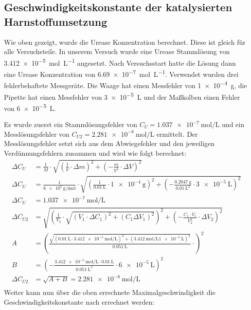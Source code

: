 \subsection{Geschwindigkeitskonstante der katalysierten Harnstoffumsetzung}
Wie oben gezeigt, wurde die Urease Konzentration berechnet. 
Diese ist gleich für alle Versuchsteile.
In unserem Versuch wurde eine Urease Stammlösung von \qty{3,412e-5}{\mole\per\liter} angesetzt.
Nach Versuchsstart hatte die Lösung dann eine Urease Konzentration von \qty{6,69e-7}{\mole\per\liter}.
Verwendet wurden drei fehlerbehaftete Messgeräte. Die Waage hat einen Messfehler von \qty{1e-4}{\gram}, die Pipette hat einen Messfehler von \qty{3e-5}{\liter} und der Maßkolben einen Fehler von \qty{6e-5}{\liter}.

Es wurde zuerst ein Stammlösungsfehler von $C_U = \qty{1,037e-7}{\mole\per\liter}$ und ein Messlösungsfehler von $C_{U2} = \qty{2,281e-8}{\mole\per\liter}$ ermittelt.
Der Messlösungsfehler setzt sich aus dem Abwiegefehler und den jeweiligen Verdünnungsfehlern zusammen und wird wie folgt berechnet:
\begin{align*}
\Delta C_U &= \frac{1}{M} \cdot \sqrt{\left(\frac{1}{V}\cdot \Delta m \right)^2 + \left( - \frac{m}{V^2} \cdot \Delta V \right)^2}\\
\Delta C_U &= \frac{1}{\qty{6e5}{\gram \per \mole}} \cdot   \sqrt{
    \left(
        \frac{1}{\qty{0.01}{\liter}}\cdot \qty{1e-4}{\gram}
    \right)^2 +
   \left(
        -\frac{\qty{0.2047}{\gram}}{\qty{0.01}{\liter}^2} \cdot \qty{3e-5}{\liter}
    \right)^2
    }\\
\Delta C_U &= \qty{1,037e-7}{\mole\per\liter}\\
\Delta C_{U2} &= \sqrt{\left(\frac{1}{V_2}\cdot \sqrt{\left( V_1 \cdot \Delta C_1 \right)^2 + \left( C_1 \Delta V_1 \right)^2}\right)^2 +\left( - \frac{C_1 \cdot V_1}{V_2^2}\cdot \Delta V_2 \right)^2}\\
A&=\left(\frac{\sqrt{( \qty{0,01}{\liter} \cdot \qty{3,412e-5}{\mole\per\liter} )^2 + \left( \qty{3,412}{\mole\per\liter} \qty{1e-5}{\liter} \right)^2}}{\qty{0,051}{\liter}}\cdot \right)^2 \\
    B&=\left( - \frac{\qty{3,412e-5}{\mole\per\liter} \cdot\qty{0,01}{\liter}}{\qty{0,051}{\liter}^2}\cdot \qty{6e-5}{\liter} \right)^2\\
    \Delta C_{U2} &= \sqrt{ A+ B} = \qty{2,281e-8}{\mole\per\liter}\\
\end{align*}
Weiter kann nun über die oben errechnete Maximalgeschwindigkeit die Geschwindigkeitskonstante nach errechnet werden:
